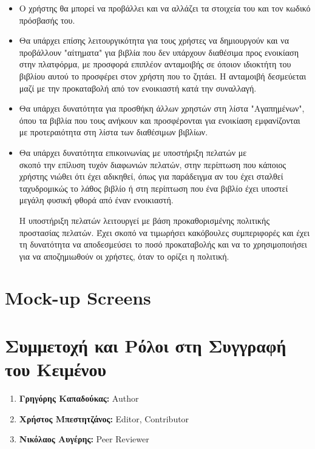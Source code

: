 \documentclass[12pt,a4paper]{article}
\begin{document}
\begin{itemize}
	\item Ο χρήστης θα μπορεί να προβάλλει και να αλλάζει τα στοιχεία του και τον κωδικό πρόσβασής του.

	\item Θα υπάρχει επίσης λειτουργικότητα για τους χρήστες να δημιουργούν και να προβάλλουν "αίτηματα" για βιβλία που δεν υπάρχουν διαθέσιμα προς ενοικίαση στην πλατφόρμα, με προσφορά επιπλέον ανταμοιβής σε όποιον ιδιοκτήτη του βιβλίου αυτού το προσφέρει στον χρήστη που το ζητάει. Η ανταμοιβή δεσμεύεται μαζί με την προκαταβολή από τον ενοικιαστή κατά την συναλλαγή.

	\item Θα υπάρχει δυνατότητα για προσθήκη άλλων χρηστών στη λίστα "Αγαπημένων", όπου τα βιβλία που τους ανήκουν και προσφέρονται για ενοικίαση εμφανίζονται με προτεραιότητα στη λίστα των διαθέσιμων βιβλίων.

	\item Θα υπάρχει δυνατότητα επικοινωνίας με υποστήριξη πελατών με \\σκοπό την επίλυση τυχόν διαφωνιών πελατών, στην περίπτωση που κάποιος χρήστης νιώθει ότι έχει αδικηθεί, όπως για παράδειγμα αν του έχει σταλθεί ταχυδρομικώς το λάθος βιβλίο ή στη περίπτωση που ένα βιβλίο έχει υποστεί μεγάλη φυσική φθορά από έναν ενοικιαστή. 

		Η υποστήριξη πελατών λειτουργεί με βάση προκαθορισμένης πολιτικής προστασίας πελατών. Έχει σκοπό να τιμωρήσει κακόβουλες συμπεριφορές και έχει τη δυνατότητα να αποδεσμεύσει το ποσό προκαταβολής και να το χρησιμοποιήσει για να αποζημιωθούν οι χρήστες, όταν το ορίζει η πολιτική.

\end{itemize}

\section{Mock-up Screens}

\section{Συμμετοχή και Ρόλοι στη Συγγραφή του Κειμένου}
\begin{enumerate}
	\item \textbf{Γρηγόρης Καπαδούκας:} Author
	\item \textbf{Χρήστος Μπεστητζάνος:} Editor, Contributor
	\item \textbf{Νικόλαος Αυγέρης:} Peer Reviewer
\end{enumerate}
\end{document}
